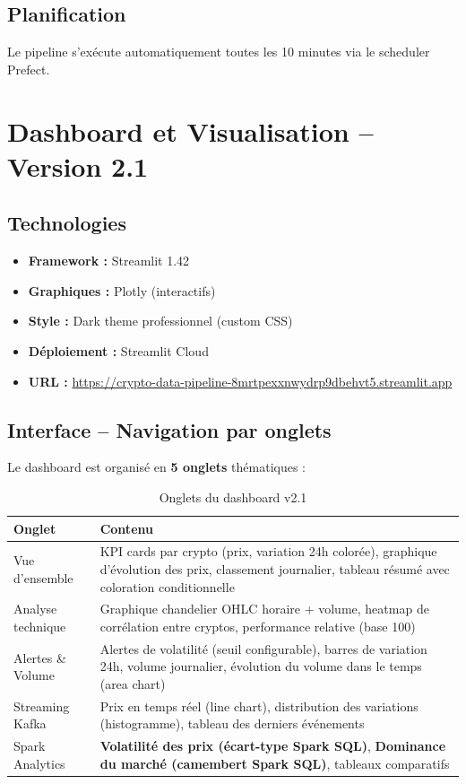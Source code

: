 \documentclass[12pt,a4paper]{article}
\begin{document}
\subsection{Planification}
Le pipeline s'exécute automatiquement toutes les 10 minutes via le scheduler Prefect.

\section{Dashboard et Visualisation -- Version 2.1}

\subsection{Technologies}
\begin{itemize}
    \item \textbf{Framework :} Streamlit 1.42
    \item \textbf{Graphiques :} Plotly (interactifs)
    \item \textbf{Style :} Dark theme professionnel (custom CSS)
    \item \textbf{Déploiement :} Streamlit Cloud
    \item \textbf{URL :} \url{https://crypto-data-pipeline-8mrtpexxnwydrp9dbehvt5.streamlit.app}
\end{itemize}

\subsection{Interface -- Navigation par onglets}

Le dashboard est organisé en \textbf{5 onglets} thématiques :

\begin{table}[H]
\centering
\begin{tabular}{|l|p{9cm}|}
\hline
\textbf{Onglet} & \textbf{Contenu} \\
\hline
Vue d'ensemble &
KPI cards par crypto (prix, variation 24h colorée),
graphique d'évolution des prix, classement journalier,
tableau résumé avec coloration conditionnelle \\
\hline
Analyse technique &
Graphique chandelier OHLC horaire + volume,
heatmap de corrélation entre cryptos,
performance relative (base 100) \\
\hline
Alertes \& Volume &
Alertes de volatilité (seuil configurable),
barres de variation 24h, volume journalier,
évolution du volume dans le temps (area chart) \\
\hline
Streaming Kafka &
Prix en temps réel (line chart),
distribution des variations (histogramme),
tableau des derniers événements \\
\hline
\rowcolor{orange!15}
Spark Analytics &
\textbf{Volatilité des prix (écart-type Spark SQL)},
\textbf{Dominance du marché (camembert Spark SQL)},
tableaux comparatifs \\
\hline
\end{tabular}
\caption{Onglets du dashboard v2.1}
\end{table}
\end{document}
